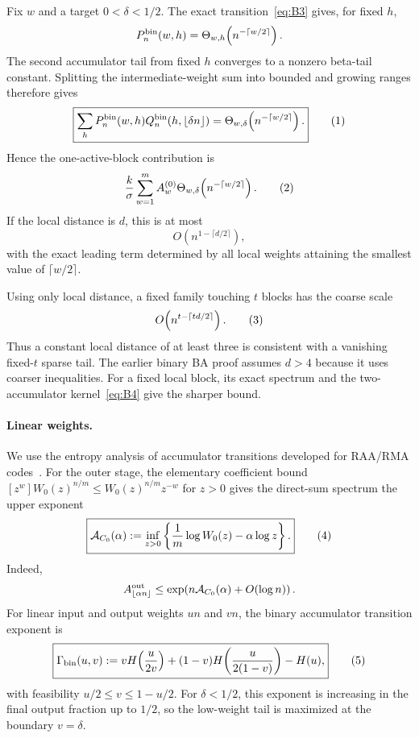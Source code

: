 Fix $w$ and a target $0<\delta<1/2$.  The exact transition~\eqref{eq:B3} gives, for
fixed $h$,
\[
    P_n^{\rm bin}(w,h)
      =
    \Theta_{w,h}\!\left(n^{-\lceil w/2\rceil}\right).
\]
The second accumulator tail from fixed $h$ converges to a nonzero beta-tail
constant.  Splitting the intermediate-weight sum into bounded and growing
ranges therefore gives
\[
    \boxed{
    \sum_h P_n^{\rm bin}(w,h)Q_n^{\rm bin}(h,\lfloor\delta n\rfloor)
      =
    \Theta_{w,\delta}\!\left(n^{-\lceil w/2\rceil}\right).
    }
    \eqnumlabel{eq:B6}
\]
Hence the one-active-block contribution is
\[
    \frac{k}{\sigma}
    \sum_{w=1}^{m}A_w^{(0)}
    \Theta_{w,\delta}\!\left(n^{-\lceil w/2\rceil}\right).
    \eqnumlabel{eq:B7}
\]
If the local distance is $d$, this is at most
\[
    O\!\left(n^{1-\lceil d/2\rceil}\right),
\]
with the exact leading term determined by all local weights attaining the
smallest value of $\lceil w/2\rceil$.

Using only local distance, a fixed family touching $t$ blocks has the coarse
scale
\[
    O\!\left(n^{t-\lceil td/2\rceil}\right).
    \eqnumlabel{eq:B8}
\]
Thus a constant local distance of at least three is consistent with a vanishing
fixed-$t$ sparse tail.  The earlier binary BA proof assumes $d>4$ because it
uses coarser inequalities.  For a fixed local block, its exact spectrum and the
two-accumulator kernel~\eqref{eq:B4} give the sharper bound.

\paragraph{Linear weights.}

We use the entropy analysis of accumulator transitions developed for RAA/RMA
codes~\cite[Sections~III--IV]{kliewer08}.  For the outer stage, the elementary
coefficient bound $[z^w]W_0(z)^{n/m}\le W_0(z)^{n/m}z^{-w}$ for $z>0$
gives the direct-sum spectrum the upper exponent
\[
    \boxed{
    \mathcal A_{C_0}(\alpha)
      :=
    \inf_{z>0}
    \left\{
      \frac1m\log W_0(z)-\alpha\log z
    \right\}.
    }
    \eqnumlabel{eq:B9}
\]
Indeed,
\[
    A_{\lfloor\alpha n\rfloor}^{\rm out}
      \le
    \exp\!\left(n\mathcal A_{C_0}(\alpha)+O(\log n)\right).
\]
For linear input and output weights $u n$ and $v n$, the binary accumulator
transition exponent is
\[
    \boxed{
    \Gamma_{\rm bin}(u,v)
      :=
    vH\!\left(\frac{u}{2v}\right)
    +(1-v)H\!\left(\frac{u}{2(1-v)}\right)
    -H(u),
    }
    \eqnumlabel{eq:B10}
\]
with feasibility $u/2\le v\le1-u/2$.  For $\delta<1/2$, this exponent is
increasing in the final output fraction up to $1/2$, so the low-weight tail is
maximized at the boundary $v=\delta$.

